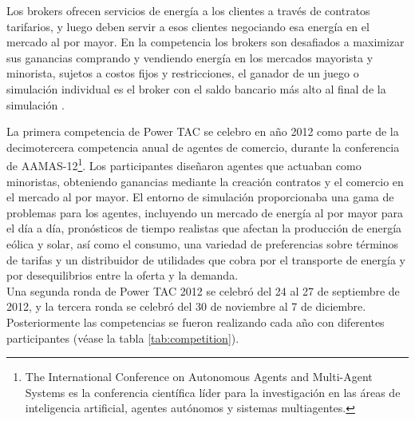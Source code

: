 Los brokers ofrecen servicios de energía a los clientes a través de contratos tarifarios, y luego deben servir a esos clientes negociando esa energía en el mercado al por mayor. En la competencia los brokers son desafiados a maximizar sus ganancias comprando y vendiendo energía en los mercados mayorista y minorista, sujetos a costos fijos y restricciones, el ganador de un juego o simulación individual es el broker con el saldo bancario más alto al final de la simulación \cite{WKetterJCollinsyMdWeerdtThe2017PowerTAC}.

La primera competencia de Power TAC se celebro en año 2012 como parte de la decimotercera competencia anual de agentes de comercio, durante la conferencia de AAMAS-12\footnote{The International Conference on Autonomous Agents and Multi-Agent Systems es la conferencia científica líder para la investigación en las áreas de inteligencia artificial, agentes autónomos y sistemas multiagentes.}. 
Los participantes diseñaron agentes  que actuaban como minoristas, obteniendo ganancias mediante la creación contratos y el comercio en el mercado al por mayor. 
El entorno  de simulación proporcionaba una gama de problemas para los agentes, incluyendo un mercado de energía al por mayor para el día a día, pronósticos de tiempo realistas que afectan la producción de energía eólica y solar, así como el consumo, una variedad de preferencias sobre términos de tarifas y un distribuidor de utilidades que cobra por el transporte de energía y por desequilibrios entre la oferta y la demanda.\\

Una segunda ronda de Power TAC 2012 se celebró del 24 al 27 de septiembre de 2012, y la tercera ronda se celebró del 30 de noviembre al 7 de diciembre. Posteriormente las competencias se fueron realizando cada año con diferentes participantes (véase la tabla \ref{tab:competition}).

